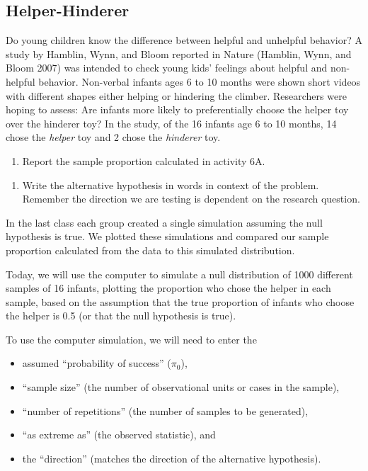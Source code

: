 \documentclass[
]{report}
\providecommand{\tightlist}{%
  \setlength{\itemsep}{0pt}\setlength{\parskip}{0pt}}
\begin{document}
\hypertarget{helper-hinderer-1}{%
\subsection{Helper-Hinderer}\label{helper-hinderer-1}}

Do young children know the difference between helpful and unhelpful behavior? A study by Hamblin, Wynn, and Bloom reported in Nature (Hamblin, Wynn, and Bloom 2007) was intended to check young kids' feelings about helpful and non-helpful behavior. Non-verbal infants ages 6 to 10 months were shown short videos with different shapes either helping or hindering the climber. Researchers were hoping to assess: Are infants more likely to preferentially choose the helper toy over the hinderer toy? In the study, of the 16 infants age 6 to 10 months, 14 chose the \emph{helper} toy and 2 chose the \emph{hinderer} toy.

\begin{enumerate}
\def\labelenumi{\arabic{enumi}.}
\tightlist
\item
  Report the sample proportion calculated in activity 6A.
\end{enumerate}

\newpage

\begin{enumerate}
\def\labelenumi{\arabic{enumi}.}
\setcounter{enumi}{1}
\tightlist
\item
  Write the alternative hypothesis in words in context of the problem. Remember the direction we are testing is dependent on the research question.
\end{enumerate}

\vspace{0.8in}

In the last class each group created a single simulation assuming the null hypothesis is true. We plotted these simulations and compared our sample proportion calculated from the data to this simulated distribution.

Today, we will use the computer to simulate a null distribution of 1000 different samples of 16 infants, plotting the proportion who chose the helper in each sample, based on the assumption that the true proportion of infants who choose the helper is 0.5 (or that the null hypothesis is true).

To use the computer simulation, we will need to enter the

\begin{itemize}
\tightlist
\item
  assumed ``probability of success'' (\(\pi_0\)),
\item
  ``sample size'' (the number of observational units or cases in the sample),
\item
  ``number of repetitions'' (the number of samples to be generated),
\item
  ``as extreme as'' (the observed statistic), and
\item
  the ``direction'' (matches the direction of the alternative hypothesis).
\end{itemize}
\end{document}
